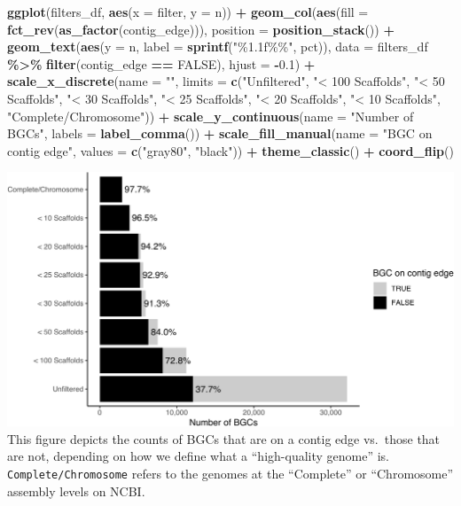 \documentclass[
]{article}
\newenvironment{Shaded}{\begin{snugshade}}{\end{snugshade}}
\newcommand{\AttributeTok}[1]{\textcolor[rgb]{0.13,0.29,0.53}{#1}}
\newcommand{\ConstantTok}[1]{\textcolor[rgb]{0.56,0.35,0.01}{#1}}
\newcommand{\FloatTok}[1]{\textcolor[rgb]{0.00,0.00,0.81}{#1}}
\newcommand{\FunctionTok}[1]{\textcolor[rgb]{0.13,0.29,0.53}{\textbf{#1}}}
\newcommand{\NormalTok}[1]{#1}
\newcommand{\SpecialCharTok}[1]{\textcolor[rgb]{0.81,0.36,0.00}{\textbf{#1}}}
\newcommand{\StringTok}[1]{\textcolor[rgb]{0.31,0.60,0.02}{#1}}
\begin{document}
\begin{Shaded}
\begin{Highlighting}[]
\FunctionTok{ggplot}\NormalTok{(filters\_df, }\FunctionTok{aes}\NormalTok{(}\AttributeTok{x =}\NormalTok{ filter, }\AttributeTok{y =}\NormalTok{ n)) }\SpecialCharTok{+}
  \FunctionTok{geom\_col}\NormalTok{(}\FunctionTok{aes}\NormalTok{(}\AttributeTok{fill =} \FunctionTok{fct\_rev}\NormalTok{(}\FunctionTok{as\_factor}\NormalTok{(contig\_edge))), }\AttributeTok{position =} \FunctionTok{position\_stack}\NormalTok{()) }\SpecialCharTok{+}
  \FunctionTok{geom\_text}\NormalTok{(}\FunctionTok{aes}\NormalTok{(}\AttributeTok{y =}\NormalTok{ n, }\AttributeTok{label =} \FunctionTok{sprintf}\NormalTok{(}\StringTok{"\%1.1f\%\%"}\NormalTok{, pct)), }\AttributeTok{data =}\NormalTok{ filters\_df }\SpecialCharTok{\%\textgreater{}\%} \FunctionTok{filter}\NormalTok{(contig\_edge }\SpecialCharTok{==} \ConstantTok{FALSE}\NormalTok{), }\AttributeTok{hjust =} \SpecialCharTok{{-}}\FloatTok{0.1}\NormalTok{) }\SpecialCharTok{+}
  \FunctionTok{scale\_x\_discrete}\NormalTok{(}\AttributeTok{name =} \StringTok{""}\NormalTok{, }\AttributeTok{limits =} \FunctionTok{c}\NormalTok{(}\StringTok{"Unfiltered"}\NormalTok{, }\StringTok{"\textless{} 100 Scaffolds"}\NormalTok{, }\StringTok{"\textless{} 50 Scaffolds"}\NormalTok{, }\StringTok{"\textless{} 30 Scaffolds"}\NormalTok{, }\StringTok{"\textless{} 25 Scaffolds"}\NormalTok{, }\StringTok{"\textless{} 20 Scaffolds"}\NormalTok{, }\StringTok{"\textless{} 10 Scaffolds"}\NormalTok{, }\StringTok{"Complete/Chromosome"}\NormalTok{)) }\SpecialCharTok{+}
  \FunctionTok{scale\_y\_continuous}\NormalTok{(}\AttributeTok{name =} \StringTok{"Number of BGCs"}\NormalTok{, }\AttributeTok{labels =} \FunctionTok{label\_comma}\NormalTok{()) }\SpecialCharTok{+}
  \FunctionTok{scale\_fill\_manual}\NormalTok{(}\AttributeTok{name =} \StringTok{"BGC on contig edge"}\NormalTok{, }\AttributeTok{values =} \FunctionTok{c}\NormalTok{(}\StringTok{"gray80"}\NormalTok{, }\StringTok{"black"}\NormalTok{)) }\SpecialCharTok{+}
  \FunctionTok{theme\_classic}\NormalTok{() }\SpecialCharTok{+}
  \FunctionTok{coord\_flip}\NormalTok{()}
\end{Highlighting}
\end{Shaded}

\includegraphics{analysis_files/figure-latex/unnamed-chunk-4-1.pdf} This
figure depicts the counts of BGCs that are on a contig edge vs.~those
that are not, depending on how we define what a ``high-quality genome''
is. \texttt{Complete/Chromosome} refers to the genomes at the
``Complete'' or ``Chromosome'' assembly levels on NCBI.
\end{document}
